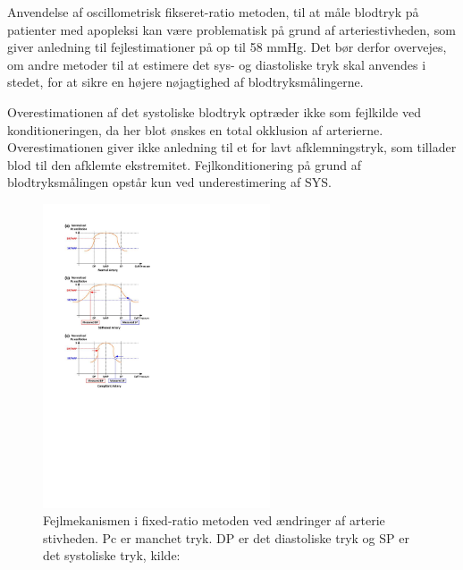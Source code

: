 Anvendelse af oscillometrisk fikseret-ratio metoden, til at måle blodtryk på patienter med apopleksi kan være problematisk på grund af arteriestivheden, som giver anledning til fejlestimationer på op til 58 mmHg. Det bør derfor overvejes, om andre metoder til at estimere det sys- og diastoliske tryk skal anvendes i stedet, for at sikre en højere nøjagtighed af blodtryksmålingerne.

Overestimationen af det systoliske blodtryk optræder ikke som fejlkilde ved konditioneringen, da her blot ønskes en total okklusion af arterierne. Overestimationen giver ikke anledning til et for lavt afklemningstryk, som tillader blod til den afklemte ekstremitet. Fejlkonditionering på grund af blodtryksmålingen opstår kun ved underestimering af SYS.

	\begin{figure}[H]
		\centering
		\includegraphics[width=0.6\textwidth]{billeder/ErrorFixed-Ratio.pdf}
		\caption{Fejlmekanismen i fixed-ratio metoden ved ændringer af arterie stivheden. Pc er manchet tryk. DP er det diastoliske tryk og SP er det systoliske tryk, kilde: \cite{RefWorks:13}}\label{fig:ErrorMechanismOfFixedRatio}
	\end{figure}

